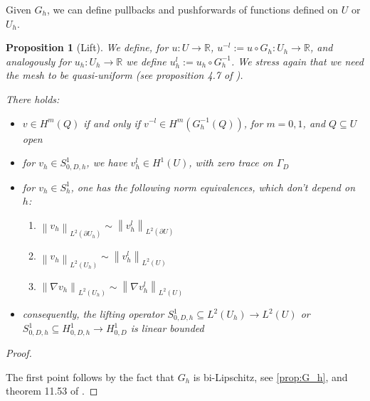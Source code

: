 \documentclass[english,a4paper,10pt,oneside]{scrbook}	%
\theoremstyle{break}
\newtheorem{prop}[equation]{Proposition}
\newenvironment{mproof}[1][\proofname]{%
  \begin{proof}[#1]$ $\par\nobreak\ignorespaces
}{%
  \end{proof}
}
\renewcommand*{\proofname}{Proof}
\theoremstyle{remark}
\newcommand{\mR}{\mathbb{R}}
\newcommand{\norm}[1]{\left\lVert#1\right\rVert}
\begin{document}
\begin{appendices}
Given $G_h$, we can define pullbacks and pushforwards of functions defined on $U$ or $U_h$.


\begin{prop}[Lift]
\label{prop:lift}
We define, for $u: U \rightarrow \mR$, $u^{-l}:=u\circ G_h : U_h \rightarrow \mR$, and analogously for $u_h: U_h \rightarrow \mR$ we define $u_h^l:=u_h\circ G_h^{-1}$. We stress again that we need the mesh to be quasi-uniform (see proposition 4.7 of \cite{elliott}).

There holds:

\begin{itemize}
	\item $v\in H^m(Q)$ if and only if $v^{-l} \in H^m(G_h^{-1}(Q))$, for $m=0,1$, and $Q\subseteq U$ open
	\item for $v_h \in S^1_{0,D,h}$, we have $v_h^l \in H^1(U)$, with zero trace on $\Gamma_D$ 
	\item for $v_h  \in S^1_h$, one has the following norm equivalences, which don't depend on $h$:
	\begin{enumerate}
		\item $\norm{v_h}_{L^2(\partial U_h)} \sim \norm{v_h^l}_{L^2(\partial U)}$
		\item $\norm{v_h}_{L^2( U_h)} \sim \norm{v_h^l}_{L^2( U)}$
		\item $\norm{\nabla v_h}_{L^2( U_h)} \sim \norm{\nabla v_h^l}_{L^2( U)}$
	\end{enumerate}
	\item consequently, the lifting operator $S^{1}_{0,D,h} \subseteq L^2(U_h) \rightarrow L^2(U)$ or $S^{1}_{0,D,h} \subseteq H^1_{0,D,h} \rightarrow H^1_{0,D}$ is linear bounded
	
\end{itemize}

\end{prop}

\begin{mproof}

The first point follows by the fact that $G_h$ is bi-Lipschitz, see \cref{prop:G_h}, and theorem 11.53 of \cite{leoni}.

%
%


\end{mproof}
\end{appendices}
\end{document}
